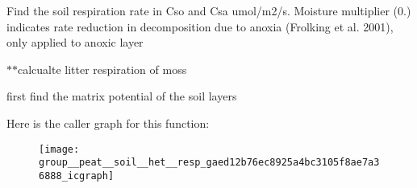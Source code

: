 Find the soil respiration rate in Cso and Csa umol/m2/s. Moisture multiplier (0.) indicates rate reduction in decomposition due to anoxia (Frolking et al. 2001), only applied to anoxic layer

$\ast$$\ast$calcualte litter respiration of moss

first find the matrix potential of the soil layers 

Here is the caller graph for this function\+:\nopagebreak
\begin{figure}[H]
\begin{center}
\leavevmode
\texttt{[image: group\_\_peat\_\_soil\_\_het\_\_resp\_gaed12b76ec8925a4bc3105f8ae7a36888\_icgraph]}
\end{center}
\end{figure}


